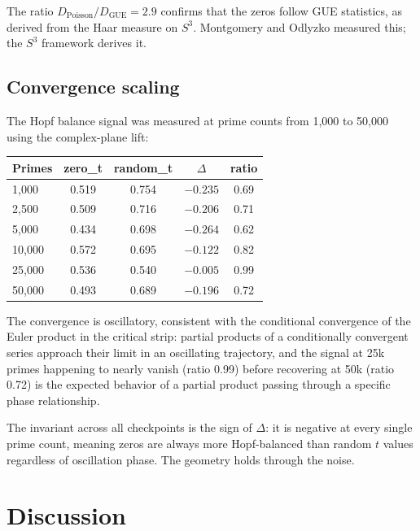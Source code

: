 \documentclass[12pt,a4paper]{article}
\theoremstyle{definition}
\theoremstyle{remark}
\begin{document}
The ratio $D_\mathrm{Poisson}/D_\mathrm{GUE} = 2.9$ confirms that the zeros
follow GUE statistics, as derived from the Haar measure on $S^3$.
Montgomery and Odlyzko measured this; the $S^3$ framework derives it.

\subsection{Convergence scaling}

The Hopf balance signal was measured at prime counts from 1,000 to 50,000
using the complex-plane lift:

\begin{center}
\begin{tabular}{lcccc}
\toprule
Primes & zero\_t & random\_t & $\Delta$ & ratio \\
\midrule
1,000 & 0.519 & 0.754 & $-0.235$ & 0.69 \\
2,500 & 0.509 & 0.716 & $-0.206$ & 0.71 \\
5,000 & 0.434 & 0.698 & $-0.264$ & 0.62 \\
10,000 & 0.572 & 0.695 & $-0.122$ & 0.82 \\
25,000 & 0.536 & 0.540 & $-0.005$ & 0.99 \\
50,000 & 0.493 & 0.689 & $-0.196$ & 0.72 \\
\bottomrule
\end{tabular}
\end{center}

The convergence is oscillatory, consistent with the conditional convergence
of the Euler product in the critical strip: partial products of a
conditionally convergent series approach their limit in an oscillating
trajectory, and the signal at 25k primes happening
to nearly vanish (ratio 0.99) before recovering at 50k (ratio 0.72) is the
expected behavior of a partial product passing through a specific phase
relationship.

The invariant across all checkpoints is the sign of $\Delta$: it is negative
at every single prime count, meaning zeros are always more Hopf-balanced than
random $t$ values regardless of oscillation phase. The geometry holds through
the noise.

\section{Discussion}
\end{document}
